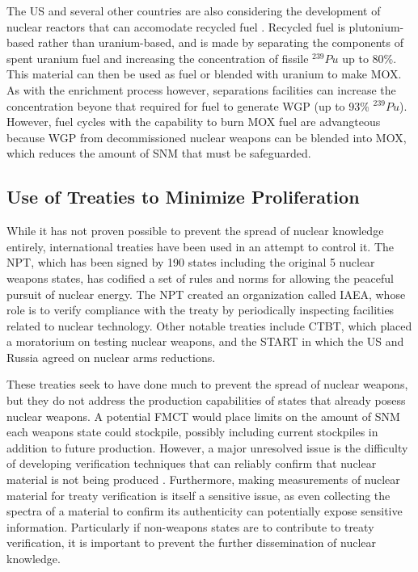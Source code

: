 The \gls{US} and several other countries are also considering the development of nuclear reactors that can accomodate recycled fuel \cite{countries_that_reprocess}.  Recycled fuel is plutonium-based rather than uranium-based, and is made by separating the components of spent uranium fuel and increasing the concentration of fissile $^{239}Pu$ up to 80\%.  This material can then be used as fuel or blended with uranium to make \gls{MOX}.  As with the enrichment process however, separations facilities can increase the concentration beyone that required for fuel to generate \gls{WGP} (up to 93\% $^{239}Pu$).  However, fuel cycles with the capability to burn \gls{MOX} fuel are advangteous because \gls{WGP} from decommissioned nuclear weapons can be blended into \gls{MOX}, which reduces the amount of \gls{SNM} that must be safeguarded.
 
\subsection{Use of Treaties to Minimize Proliferation}

While it has not proven possible to prevent the spread of nuclear knowledge entirely, international treaties have been used in an attempt to control it.  The \gls{NPT}, which has been signed by 190 states including the original 5 nuclear weapons states, has codified a set of rules and norms for allowing the peaceful pursuit of nuclear energy\cite{http://www.un.org/disarmament/WMD/Nuclear/NPT.shtml}.  The \gls{NPT} created an organization called \gls{IAEA}, whose role is to verify compliance with the treaty by periodically inspecting facilities related to nuclear technology.  Other notable treaties include \gls{CTBT}, which placed a moratorium on testing nuclear weapons, and the \gls{START} in which the \gls{US} and Russia agreed on nuclear arms reductions.

These treaties seek to have done much to prevent the spread of nuclear weapons, but they do not address the production capabilities of states that already posess nuclear weapons.  A potential \gls{FMCT} would place limits on the amount of \gls{SNM} each weapons state could stockpile, possibly including current stockpiles in addition to future production.  However, a major unresolved issue is the difficulty of developing verification techniques that can reliably confirm that nuclear material is not being produced \cite{https://www.armscontrol.org/factsheets/fmct}.  Furthermore, making measurements of nuclear material for treaty verification is itself a sensitive issue, as even collecting the spectra of a material to confirm its authenticity can potentially expose sensitive information\cite{zero_knowledge concerns}. Particularly if non-weapons states are to contribute to treaty verification, it is important to prevent the further dissemination of nuclear knowledge.

